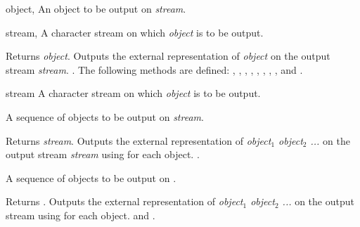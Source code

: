\begin{optDefinition}
\begin{genericargs}
    \item[object, \classref{object}] An object to be output on {\em stream}.
    \item[stream, \classref{stream}] A character stream on which {\em
        object\/} is to be output.
\end{genericargs}
%
\result%
Returns {\em object}.
%
\remarks%
Outputs the external representation of {\em object\/} on the output stream {\em
    stream\/}.
%
\seealso%
.  The following  methods are
defined: ,
, ,
,
, ,
, ,
 and .

\begin{arguments}
    \item[stream] A character stream on which {\em object\/} is
    to be output.
    \item[{\optional{object$_1$ object$_2$ ...}}] A sequence of objects to be
    output on {\em stream}.
\end{arguments}
%
\result%
Returns {\em stream}.
%
\remarks%
Outputs the external representation of {\em object$_1$ object$_2$ ...} on the
output stream {\em stream\/} using  for each object.
%
\seealso%
.

\begin{arguments}
    \item[{\optional{object$_1$ object$_2$ ...}}] A sequence of objects to be
    output on .
\end{arguments}
%
\result%
Returns .
%
\remarks%
Outputs the external representation of {\em object$_1$ object$_2$ ...} on the
output stream  using  for each object.
%
\seealso%
 and .


\end{optDefinition}
